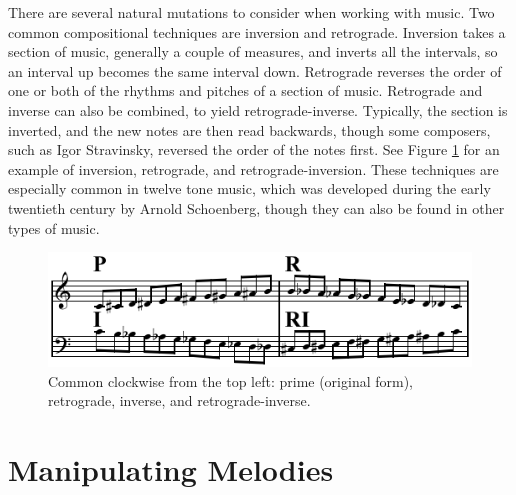 There are several natural mutations to consider when working with music.
Two common compositional techniques are inversion and retrograde.
Inversion takes a section of music, generally a couple of measures, and inverts all the intervals, so an interval up becomes the same interval down.
Retrograde reverses the order of one or both of the rhythms and pitches of a section of music.
Retrograde and inverse can also be combined, to yield retrograde-inverse.
Typically, the section is inverted, and the new notes are then read backwards, though some composers, such as Igor Stravinsky, reversed the order of the notes first.
See Figure \ref{fig:p-r-i-ri} for an example of inversion, retrograde, and retrograde-inversion.
These techniques are especially common in twelve tone music, which was developed during the early twentieth century by Arnold Schoenberg, though they can also be found in other types of music. %

\begin{figure}
	\centering
	\includegraphics[width=\linewidth]{figures/P-R-I-RI.png} %
	\caption{Common  clockwise from the top left: prime (original form), retrograde, inverse, and retrograde-inverse.}
	\label{fig:p-r-i-ri}
\end{figure}

\section{Manipulating Melodies} \label{ga:manip}


